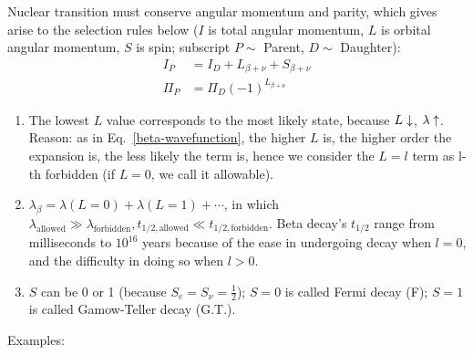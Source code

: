 \documentclass{school-22.101-notes}
\begin{document}
Nuclear transition must conserve angular momentum and parity, which gives arise to the selection rules below ($I$ is total angular momentum, $L$ is orbital angular momentum, $S$ is spin; subscript $P \sim$ Parent, $D \sim$ Daughter):
\begin{align}
I_P &= I_D + L_{\beta + \nu} + S_{\beta +\nu} \\
\Pi_P &= \Pi_D (-1)^{L_{\beta + \nu}}
\end{align}
\begin{enumerate}
\item The lowest $L$ value corresponds to the most likely state, because $L \downarrow$, $\lambda \uparrow$. Reason: as in Eq.~\ref{beta-wavefunction}, the higher $L$ is, the higher order the expansion is, the less likely the term is, hence we consider the $L=l$ term as l-th forbidden (if $L=0$, we call it allowable). 
\item $\lambda_{\beta} = \lambda (L=0) + \lambda (L=1) + \cdots$, in which $\lambda_{\mathrm{allowed}} \gg \lambda_{\mathrm{forbidden}}, t_{1/2,\mathrm{allowed}} \ll t_{1/2,\mathrm{forbidden}}$. Beta decay's $t_{1/2}$ range from milliseconds to $10^{16}$ years because of the ease in undergoing decay when $l=0$, and the difficulty in doing so when $l>0$. 
\item $S$ can be 0 or 1 (because $S_e = S_{\nu} = \frac{1}{2}$); $S = 0$ is called Fermi decay (F); $S=1$ is called Gamow-Teller decay (G.T.).
\end{enumerate}
Examples:
\end{document}
